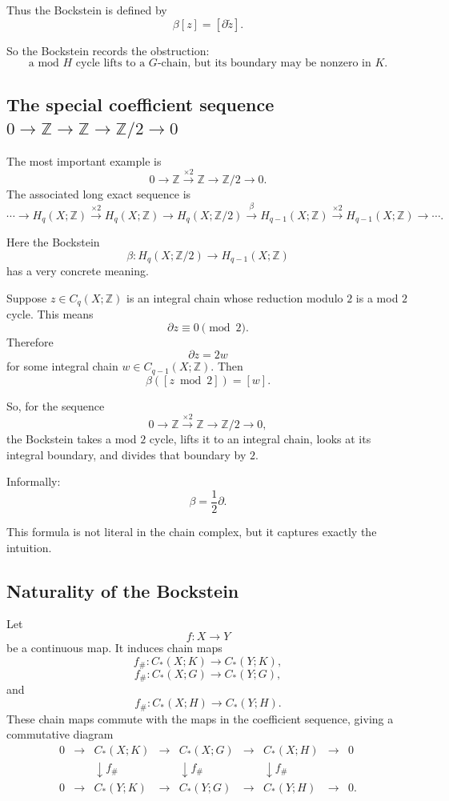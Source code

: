 \documentclass[12pt,a4paper]{article}
\theoremstyle{notespace}
\begin{document}
Thus the Bockstein is defined by
\[
\boxed{
	\beta[z]=[\partial \widetilde z].
}
\]

So the Bockstein records the obstruction:
\[
\boxed{
	\text{a mod }H\text{ cycle lifts to a }G\text{-chain, but its boundary may be nonzero in }K.
}
\]

\subsection{The special coefficient sequence \(0\to\mathbb Z\to\mathbb Z\to\mathbb Z/2\to 0\)}

The most important example is
\[
0
\longrightarrow
\mathbb Z
\xrightarrow{\times 2}
\mathbb Z
\longrightarrow
\mathbb Z/2
\longrightarrow
0.
\]
The associated long exact sequence is
\[
\cdots
\longrightarrow
H_q(X;\mathbb Z)
\xrightarrow{\times 2}
H_q(X;\mathbb Z)
\longrightarrow
H_q(X;\mathbb Z/2)
\xrightarrow{\beta}
H_{q-1}(X;\mathbb Z)
\xrightarrow{\times 2}
H_{q-1}(X;\mathbb Z)
\longrightarrow
\cdots .
\]

Here the Bockstein
\[
\beta:H_q(X;\mathbb Z/2)
\longrightarrow
H_{q-1}(X;\mathbb Z)
\]
has a very concrete meaning.

Suppose \(z\in C_q(X;\mathbb Z)\) is an integral chain whose reduction modulo \(2\) is a mod \(2\) cycle. This means
\[
\partial z\equiv 0\pmod 2.
\]
Therefore
\[
\partial z=2w
\]
for some integral chain \(w\in C_{q-1}(X;\mathbb Z)\). Then
\[
\boxed{
	\beta([z\bmod 2])=[w].
}
\]

So, for the sequence
\[
0\to\mathbb Z\xrightarrow{\times 2}\mathbb Z\to\mathbb Z/2\to 0,
\]
the Bockstein takes a mod \(2\) cycle, lifts it to an integral chain, looks at its integral boundary, and divides that boundary by \(2\).

Informally:
\[
\boxed{
	\beta=\frac{1}{2}\partial.
}
\]

This formula is not literal in the chain complex, but it captures exactly the intuition.

\subsection{Naturality of the Bockstein}

Let
\[
f:X\longrightarrow Y
\]
be a continuous map. It induces chain maps
\[
f_\#:C_*(X;K)\longrightarrow C_*(Y;K),
\]
\[
f_\#:C_*(X;G)\longrightarrow C_*(Y;G),
\]
and
\[
f_\#:C_*(X;H)\longrightarrow C_*(Y;H).
\]
These chain maps commute with the maps in the coefficient sequence, giving a commutative diagram
\[
\begin{array}{ccccccccc}
	0 &\longrightarrow& C_*(X;K) &\longrightarrow& C_*(X;G) &\longrightarrow& C_*(X;H) &\longrightarrow& 0 \\[1mm]
	&& \downarrow f_\# && \downarrow f_\# && \downarrow f_\# && \\[1mm]
	0 &\longrightarrow& C_*(Y;K) &\longrightarrow& C_*(Y;G) &\longrightarrow& C_*(Y;H) &\longrightarrow& 0 .
\end{array}
\]
\end{document}
